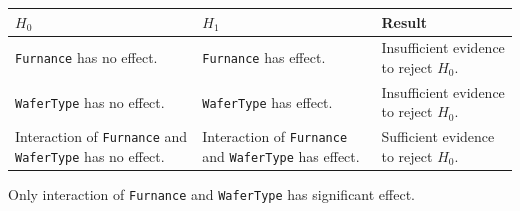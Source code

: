 \documentclass[11pt]{article}
\begin{document}
\begin{longtable}[]{@{}lll@{}}
\toprule
\begin{minipage}[b]{0.30\columnwidth}\raggedright
\(H_0\)\strut
\end{minipage} & \begin{minipage}[b]{0.30\columnwidth}\raggedright
\(H_1\)\strut
\end{minipage} & \begin{minipage}[b]{0.30\columnwidth}\raggedright
Result\strut
\end{minipage}\tabularnewline
\midrule
\endhead
\begin{minipage}[t]{0.30\columnwidth}\raggedright
\texttt{Furnance} has no effect.\strut
\end{minipage} & \begin{minipage}[t]{0.30\columnwidth}\raggedright
\texttt{Furnance} has effect.\strut
\end{minipage} & \begin{minipage}[t]{0.30\columnwidth}\raggedright
Insufficient evidence to reject \(H_0\).\strut
\end{minipage}\tabularnewline
\begin{minipage}[t]{0.30\columnwidth}\raggedright
\texttt{WaferType} has no effect.\strut
\end{minipage} & \begin{minipage}[t]{0.30\columnwidth}\raggedright
\texttt{WaferType} has effect.\strut
\end{minipage} & \begin{minipage}[t]{0.30\columnwidth}\raggedright
Insufficient evidence to reject \(H_0\).\strut
\end{minipage}\tabularnewline
\begin{minipage}[t]{0.30\columnwidth}\raggedright
Interaction of \texttt{Furnance} and \texttt{WaferType} has no
effect.\strut
\end{minipage} & \begin{minipage}[t]{0.30\columnwidth}\raggedright
Interaction of \texttt{Furnance} and \texttt{WaferType} has
effect.\strut
\end{minipage} & \begin{minipage}[t]{0.30\columnwidth}\raggedright
Sufficient evidence to reject \(H_0\).\strut
\end{minipage}\tabularnewline
\bottomrule
\end{longtable}

Only interaction of \texttt{Furnance} and \texttt{WaferType} has
significant effect.
\end{document}
